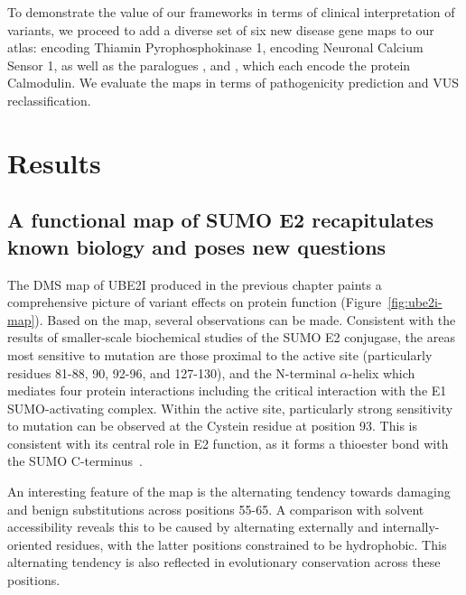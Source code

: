 To demonstrate the value of our frameworks in terms of clinical interpretation of variants, we proceed to add a diverse set of six new disease gene maps to our atlas:  encoding Thiamin Pyrophosphokinase 1,  encoding Neuronal Calcium Sensor 1, as well as the paralogues ,  and , which each encode the protein Calmodulin. We evaluate the maps in terms of pathogenicity prediction and VUS reclassification.

\section{Results}


\subsection{A functional map of SUMO E2 recapitulates known biology and poses new questions}


The DMS map of UBE2I produced in the previous chapter paints a comprehensive picture of variant effects on protein function (Figure~\ref{fig:ube2i-map}). Based on the map, several observations can be made. Consistent with the results of smaller-scale biochemical studies of the SUMO E2 conjugase\cite{bencsath_identification_2002,bernier-villamor_structural_2002}, the areas most sensitive to mutation are those proximal to the active site (particularly residues 81-88, 90, 92-96, and 127-130), and the N-terminal $\alpha$-helix which mediates four protein interactions including the critical interaction with the E1 SUMO-activating complex. Within the active site, particularly strong sensitivity to mutation can be observed at the Cystein residue at position 93. This is consistent with its central role in E2 function, as it forms a thioester bond with the SUMO C-terminus~\cite{bernier-villamor_structural_2002}.

An interesting feature of the map is the alternating tendency towards damaging and benign substitutions across positions 55-65. A comparison with solvent accessibility reveals this to be caused by alternating externally and internally-oriented residues, with the latter positions constrained to be hydrophobic. This alternating tendency is also reflected in evolutionary conservation across these positions. 

